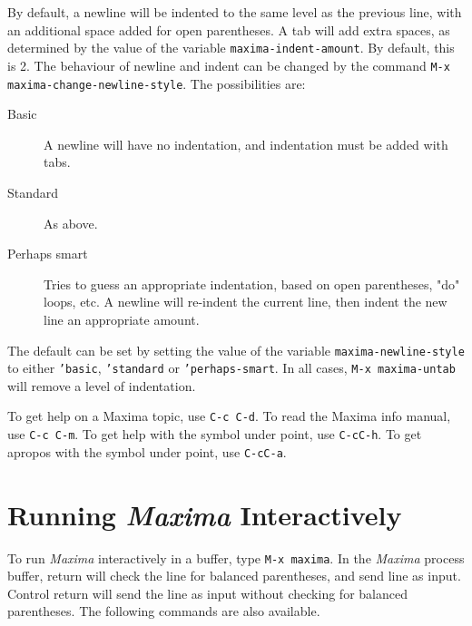 \documentclass{article}
\newcommand{\mx}{\textsl{\sffamily Maxima}}
\begin{document}
By default, a newline will be indented to the same level as the 
previous line, with an additional space added for open parentheses.
A tab will add extra spaces, as determined by the value of the 
variable \texttt{maxima-indent-amount}.  By default, this is 2.
The behaviour of newline and indent can be changed by the command 
\texttt{M-x maxima-change-newline-style}.  The possibilities are:
\begin{description}
\item[Basic] A newline will have no indentation, and indentation
               must be added with tabs.
\item[Standard]      As above.
\item[Perhaps smart] Tries to guess an appropriate indentation, based on
               open parentheses, "do" loops, etc.
               A newline will re-indent the current line, then indent
               the new line an appropriate amount.
\end{description}
The default can be set by setting the value of the variable 
\texttt{maxima-newline-style} to either \texttt{'basic}, 
\texttt{'standard} or \texttt{'perhaps-smart}.
In all cases, \texttt{M-x maxima-untab} will remove a level of indentation.

To get help on a Maxima topic, use \texttt{C-c C-d}.
To read the Maxima info manual, use \texttt{C-c C-m}.
To get help with the symbol under point, use \texttt{C-cC-h}.
To get apropos with the symbol under point, use \texttt{C-cC-a}.


\section{Running \mx{} Interactively}

\noindent
To run \mx{} interactively in a buffer, type \texttt{M-x maxima}.
In the \mx{} process buffer,
return will check the line for balanced parentheses, and send line as input.
Control return will send the line as input without checking for balanced
parentheses.  The following commands are also available.

\smallskip
\end{document}
